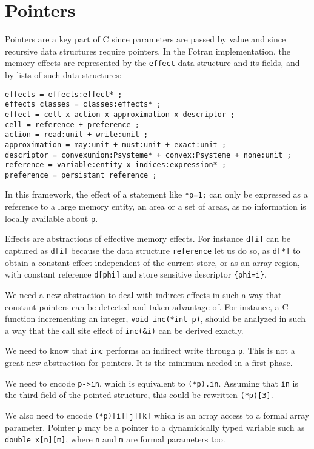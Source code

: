 \documentclass[a4paper]{report}
\begin{document}
\section{Pointers}

Pointers are a key part of C since parameters are passed by value and
since recursive data structures require pointers. In the Fotran
implementation, the memory effects are represented by the
\verb/effect/ data structure and its fields, and by lists of such data
structures:

\begin{verbatim}
effects = effects:effect* ;
effects_classes = classes:effects* ;
effect = cell x action x approximation x descriptor ;
cell = reference + preference ;
action = read:unit + write:unit ;
approximation = may:unit + must:unit + exact:unit ;
descriptor = convexunion:Psysteme* + convex:Psysteme + none:unit ;
reference = variable:entity x indices:expression* ;
preference = persistant reference ;
\end{verbatim}

In this framework, the effect of a statement like \verb/*p=1;/ can
 only be expressed as a reference to a large memory
 entity, an area or a set of areas, as no information is locally
 available about \verb/p/.

Effects are abstractions of effective memory effects. For instance
\verb/d[i]/ can be captured as \verb/d[i]/ because the data structure
\verb/reference/ let us do so, as \verb/d[*]/ to obtain a constant
effect independent of the current store, or as an array region, with
constant reference \verb/d[phi]/ and store sensitive descriptor
\verb/{phi=i}/.

We need a new abstraction to deal with indirect effects in such a way
that constant pointers can be detected and taken advantage of. For
instance, a C function incrementing an integer, \verb/void inc(*int p)/,
should be analyzed in such a way that the call site effect of
\verb/inc(&i)/ can be derived exactly.

We need to know that \verb/inc/ performs an indirect write through
\verb/p/.  This is not a great new abstraction for pointers. It is the
minimum needed in a first phase.

We need to encode \verb/p->in/, which is equivalent to
 \verb/(*p).in/. Assuming that \verb/in/ is the third field of the
 pointed structure, this could be rewritten \verb/(*p)[3]/.

We also need to encode \verb/(*p)[i][j][k]/ which is an array access to
 a formal array parameter. Pointer \verb/p/ may be a pointer to a
 dynamicically typed variable such as \verb/double x[n][m]/, where
 \verb/n/ and \verb/m/ are formal parameters too.
\end{document}

